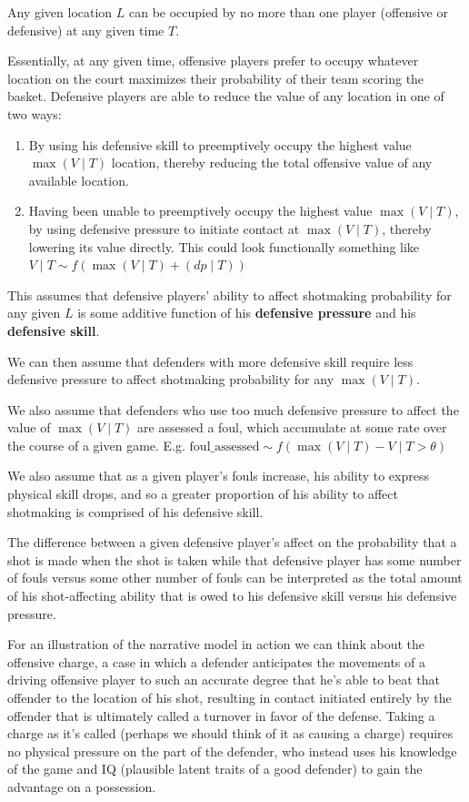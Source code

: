 \documentclass[
  letterpaper,
  DIV=11,
  numbers=noendperiod]{scrartcl}
\begin{document}
Any given location \(L\) can be occupied by no more than one player
(offensive or defensive) at any given time \(T\).

Essentially, at any given time, offensive players prefer to occupy
whatever location on the court maximizes their probability of their team
scoring the basket. Defensive players are able to reduce the value of
any location in one of two ways:

\begin{enumerate}
\def\labelenumi{\arabic{enumi}.}
\item
  By using his defensive skill to preemptively occupy the highest value
  \(\max(V \mid T)\) location, thereby reducing the total offensive
  value of any available location.
\item
  Having been unable to preemptively occupy the highest value
  \(\max(V \mid T)\), by using defensive pressure to initiate contact at
  \(\max(V \mid T)\), thereby lowering its value directly. This could
  look functionally something like
  \(V \mid T \sim f(\max(V \mid T) + (dp \mid T))\)
\end{enumerate}

This assumes that defensive players' ability to affect shotmaking
probability for any given \(L\) is some additive function of his
\textbf{defensive pressure} and his \textbf{defensive skill}.

We can then assume that defenders with more defensive skill require less
defensive pressure to affect shotmaking probability for any
\(\max(V \mid T)\).

We also assume that defenders who use too much defensive pressure to
affect the value of \(\max(V \mid T)\) are assessed a foul, which
accumulate at some rate over the course of a given game. E.g.
\(\text{foul\_assessed} \sim f(\max(V \mid T) - V \mid T > \theta)\)

We also assume that as a given player's fouls increase, his ability to
express physical skill drops, and so a greater proportion of his ability
to affect shotmaking is comprised of his defensive skill.

The difference between a given defensive player's affect on the
probability that a shot is made when the shot is taken while that
defensive player has some number of fouls versus some other number of
fouls can be interpreted as the total amount of his shot-affecting
ability that is owed to his defensive skill versus his defensive
pressure.

For an illustration of the narrative model in action we can think about
the offensive charge, a case in which a defender anticipates the
movements of a driving offensive player to such an accurate degree that
he's able to beat that offender to the location of his shot, resulting
in contact initiated entirely by the offender that is ultimately called
a turnover in favor of the defense. Taking a charge as it's called
(perhaps we should think of it as causing a charge) requires no physical
pressure on the part of the defender, who instead uses his knowledge of
the game and IQ (plausible latent traits of a good defender) to gain the
advantage on a possession.
\end{document}
